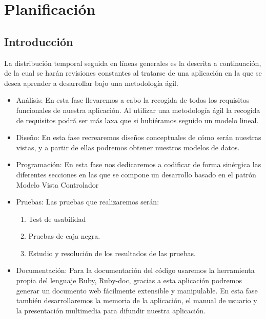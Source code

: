 

\section{Planificación}
\subsection{Introducción}
La distribución temporal seguida en líneas generales es la descrita a
continuación, de la cual se harán revisiones constantes al tratarse de
una aplicación en la que se desea aprender a desarrollar bajo una
metodología ágil.
\begin{itemize}
  \item Análisis: En esta fase llevaremos a cabo la recogida de todos
    los requisitos funcionales de nuestra aplicación. Al utilizar una
    metodología ágil la recogida de requisitos podrá ser más laxa que
    si hubiéramos seguido un modelo lineal.
  \item Diseño: En esta fase recrearemos diseños conceptuales de cómo
    serán nuestras vistas, y a partir de ellas podremos obtener
    nuestros modelos de datos.
  \item Programación: En esta fase nos dedicaremos a codificar de
    forma sinérgica las diferentes secciones en las que se compone un
    desarrollo basado en el patrón Modelo Vista Controlador
  \item Pruebas: Las pruebas que realizaremos serán:
    \begin{enumerate}
      \item Test de usabilidad
      \item Pruebas de caja negra.
      \item Estudio y resolución de los resultados de las pruebas.
    \end{enumerate}
  \item Documentación: Para la documentación del código usaremos la
    herramienta propia del lenguaje Ruby, Ruby-doc, gracias a esta
    aplicación podremos generar un documento web fácilmente extensible
    y manipulable. En esta fase también desarrollaremos la memoria de
    la aplicación, el manual de usuario y la presentación multimedia
    para difundir nuestra aplicación.
\end{itemize}